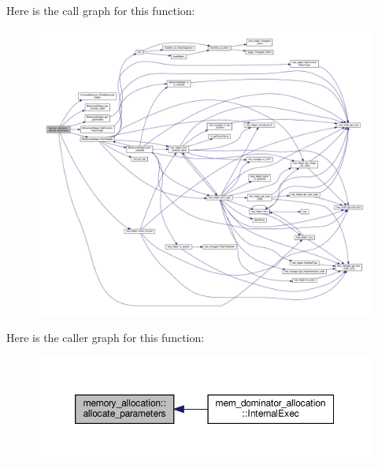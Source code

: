 Here is the call graph for this function\+:
\nopagebreak
\begin{figure}[H]
\begin{center}
\leavevmode
\includegraphics[width=350pt]{db/d9f/classmemory__allocation_aa7ac453565415a72d89c814c8206bbba_cgraph}
\end{center}
\end{figure}
Here is the caller graph for this function\+:
\nopagebreak
\begin{figure}[H]
\begin{center}
\leavevmode
\includegraphics[width=350pt]{db/d9f/classmemory__allocation_aa7ac453565415a72d89c814c8206bbba_icgraph}
\end{center}
\end{figure}
\mbox{\label{classmemory__allocation_a5c9d84d593aeca03b90d1fc14244bdc9}} 
